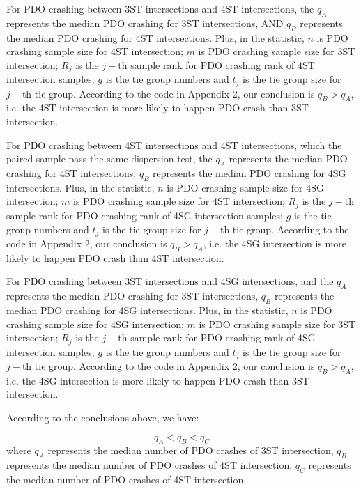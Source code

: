 \documentclass[11pt]{scrartcl} %
\begin{document}
\par

For PDO crashing between 3ST intersections and 4ST intersections, the ${q_A}$ represents the median PDO crashing for 3ST intersections, AND $q_B$ represents the median PDO crashing for 4ST intersections. Plus, in the statistic, $n$ is PDO crashing sample size for 4ST intersection; $m$ is PDO crashing sample size for 3ST intersection; $R_j$ is the $j-$th sample rank for PDO crashing rank of 4ST intersection samples; $g$ is the tie group numbers and $t_j$ is the tie group size for $j-$th tie group. According to the code in Appendix 2, our conclusion is ${{q_B} > {q_A}}$, i.e. the 4ST intersection is more likely to happen PDO crash than 3ST intersection.

\par

For PDO crashing between 4ST intersections and 4ST intersections, which the paired sample pass the same dispersion test, the ${q_A}$ represents the median PDO crashing for 4ST intersections, $q_B$ represents the median PDO crashing for 4SG intersections. Plus, in the statistic, $n$ is PDO crashing sample size for 4SG intersection; $m$ is PDO crashing sample size for 4ST intersection; $R_j$ is the $j-$th sample rank for PDO crashing rank of 4SG intersection samples; $g$ is the tie group numbers and $t_j$ is the tie group size for $j-$th tie group. According to the code in Appendix 2, our conclusion is ${{q_B} > {q_A}}$, i.e. the 4SG intersection is more likely to happen PDO crash than 4ST intersection.

\par

For PDO crashing between 3ST intersections and 4SG intersections, and the ${q_A}$ represents the median PDO crashing for 3ST intersections, $q_B$ represents the median PDO crashing for 4SG intersections. Plus, in the statistic, $n$ is PDO crashing sample size for 4SG intersection; $m$ is PDO crashing sample size for 3ST intersection; $R_j$ is the $j-$th sample rank for PDO crashing rank of 4SG intersection samples; $g$ is the tie group numbers and $t_j$ is the tie group size for $j-$th tie group. According to the code in Appendix 2, our conclusion is ${{q_B} > {q_A}}$, i.e. the 4SG intersection is more likely to happen PDO crash than 3ST intersection.

\par

According to the conclusions above, we have:

\begin{equation*}
{q_A} < {q_B} < {q_C}
\end{equation*}
where $q_A$ represents the median number of PDO crashes of 3ST intersection, $q_B$ represents the median number of PDO crashes of 4ST intersection, $q_C$ represents the median number of PDO crashes of 4ST intersection.
\end{document}
